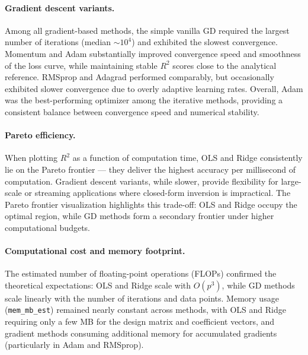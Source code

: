 \documentclass[
    article
 reprint,            %
 amsmath,amssymb,
 aps,
]{revtex4-2}
\begin{document}
\paragraph*{Gradient descent variants.}
Among all gradient-based methods, the simple vanilla GD required the largest number of iterations (median $\sim10^4$) and exhibited the slowest convergence.
Momentum and Adam substantially improved convergence speed and smoothness of the loss curve, while maintaining stable $R^2$ scores close to the analytical reference. 
RMSprop and Adagrad performed comparably, but occasionally exhibited slower convergence due to overly adaptive learning rates.
Overall, Adam was the best-performing optimizer among the iterative methods, providing a consistent balance between convergence speed and numerical stability.

\paragraph*{Pareto efficiency.}
When plotting $R^2$ as a function of computation time, OLS and Ridge consistently lie on the Pareto frontier — they deliver the highest accuracy per millisecond of computation.
Gradient descent variants, while slower, provide flexibility for large-scale or streaming applications where closed-form inversion is impractical.
The Pareto frontier visualization highlights this trade-off: OLS and Ridge occupy the optimal region, while GD methods form a secondary frontier under higher computational budgets.


\paragraph*{Computational cost and memory footprint.}
The estimated number of floating-point operations (FLOPs) confirmed the theoretical expectations:
OLS and Ridge scale with $O(p^3)$, while GD methods scale linearly with the number of iterations and data points. 
Memory usage (\texttt{mem\_mb\_est}) remained nearly constant across methods, with OLS and Ridge requiring only a few MB for the design matrix and coefficient vectors, and gradient methods consuming additional memory for accumulated gradients (particularly in Adam and RMSprop).

\end{document}
